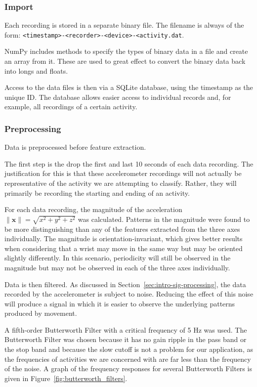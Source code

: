       \subsubsection{Import}
        Each recording is stored in a separate binary file. The filename is always of the form: \texttt{<timestamp>-<recorder>-<device>-<activity.dat}. 
        
        NumPy includes methods to specify the types of binary data in a file and create an array from it. These are used to great effect to convert the binary data back into longs and floats.
        
        Access to the data files is then via a SQLite database, using the timestamp as the unique ID. The database allows easier access to individual records and, for example, all recordings of a certain activity.
      \subsubsection{Preprocessing}
        Data is preprocessed before feature extraction.
        
        The first step is the drop the first and last 10 seconds of each data recording. The justification for this is that these accelerometer recordings will not actually be representative of the activity we are attempting to classify. Rather, they will primarily be recording the starting and ending of an activity.
        
        For each data recording, the magnitude of the acceleration $\|\mathbf{x}\| = \sqrt{x^2+y^2+z^2}$ was calculated. Patterns in the magnitude were found to be more distinguishing than any of the features extracted from the three axes individually. The magnitude is orientation-invariant, which gives better results when considering that a wrist may move in the same way but may be oriented slightly differently. In this scenario, periodicity will still be observed in the magnitude but may not be observed in each of the three axes individually.
        
        Data is then filtered. As discussed in Section~\ref{sec:intro-sig-processing}, the data recorded by the accelerometer is subject to noise. Reducing the effect of this noise will produce a signal in which it is easier to observe the underlying patterns produced by movement.
        
        A fifth-order Butterworth Filter with a critical frequency of 5 \si{Hz} was used. The Butterworth Filter was chosen because it has no gain ripple in the pass band or the stop band and because the slow cutoff is not a problem for our application, as the frequencies of activities we are concerned with are far less than the frequency of the noise. A graph of the frequency responses for several Butterworth Filters is given in Figure~\ref{fig:butterworth_filters}.
        
